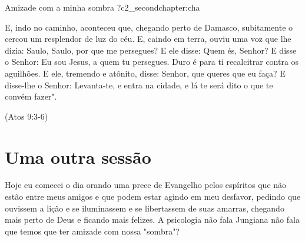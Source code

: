 


\begin{chapterpage}{Amizade com a minha sombra ?}{c2_secondchapter:cha}

\begin{myquotation}E, indo no caminho, aconteceu que, chegando perto de Damasco, subitamente o cercou um resplendor de luz do céu.
E, caindo em terra, ouviu uma voz que lhe dizia: Saulo, Saulo, por que me persegues?
E ele disse: Quem és, Senhor? E disse o Senhor: Eu sou Jesus, a quem tu persegues. Duro é para ti recalcitrar contra os aguilhões.
E ele, tremendo e atônito, disse: Senhor, que queres que eu faça? E disse-lhe o Senhor: Levanta-te, e entra na cidade, e lá te será dito o que te convém fazer". \par\vspace*{15mm}
\mbox{}\hfill \emdash{}(Atos 9:3-6)
\par\end{myquotation}

\end{chapterpage}



\section{Uma outra sessão}\label{c1_images:sec}

\emdash{}Hoje eu comecei o dia orando uma prece de Evangelho pelos espíritos que não estão entre meus amigos e que podem estar agindo em meu desfavor, pedindo que ouvissem a lição e se iluminassem e se libertassem de suas amarras, chegando mais perto de Deus e ficando mais felizes. A psicologia não fala Jungiana não fala que temos que ter amizade com nossa "sombra"?

